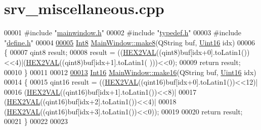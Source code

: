\hypertarget{a00048_source}{\section{srv\+\_\+miscellaneous.\+cpp}
\label{a00048_source}
}

\begin{DoxyCode}
00001 \textcolor{preprocessor}{#include "\hyperlink{a00039}{mainwindow.h}"}
00002 \textcolor{preprocessor}{#include "\hyperlink{a00001}{typedef.h}"}
00003 \textcolor{preprocessor}{#include "\hyperlink{a00034}{define.h}"}
00004 
\hypertarget{a00048_source_l00005}{}\hyperlink{a00006_aebce94d5e6af7afff661daf74b208de1}{00005} \hyperlink{a00001_aafb609548b1aa0152c46f9205b79d0f0}{Int8} \hyperlink{a00006_aebce94d5e6af7afff661daf74b208de1}{MainWindow::make8}(QString buf, \hyperlink{a00001_aae7407b021d43f7193a81a58cfb3e297}{Uint16} idx)
00006 \{
00007     qint8 result;
00008     result = ((\hyperlink{a00034_a428b04d2e2f2da2ea031a6c731660a71}{HEX2VAL}((qint8)buf[idx+0].toLatin1())<<4)|(\hyperlink{a00034_a428b04d2e2f2da2ea031a6c731660a71}{HEX2VAL}((qint8)buf[idx+1].toLatin1(
      )))<<0);
00009     \textcolor{keywordflow}{return} result;
00010 \}
00011 
00012 
\hypertarget{a00048_source_l00013}{}\hyperlink{a00006_afcb06d9f3a6a555df9355af1dfbb4e21}{00013} \hyperlink{a00001_a3985266aecb120f269789241c170850c}{Int16}  \hyperlink{a00006_afcb06d9f3a6a555df9355af1dfbb4e21}{MainWindow::make16}(QString buf, \hyperlink{a00001_aae7407b021d43f7193a81a58cfb3e297}{Uint16} idx)
00014 \{
00015     qint16 result = ((\hyperlink{a00034_a428b04d2e2f2da2ea031a6c731660a71}{HEX2VAL}((qint16)buf[idx+0].toLatin1())<<12)|
00016             (\hyperlink{a00034_a428b04d2e2f2da2ea031a6c731660a71}{HEX2VAL}((qint16)buf[idx+1].toLatin1())<<8)|
00017             (\hyperlink{a00034_a428b04d2e2f2da2ea031a6c731660a71}{HEX2VAL}((qint16)buf[idx+2].toLatin1())<<4)|
00018             (\hyperlink{a00034_a428b04d2e2f2da2ea031a6c731660a71}{HEX2VAL}((qint16)buf[idx+3].toLatin1())<<0));
00019 
00020     \textcolor{keywordflow}{return} result;
00021 \}
00022 
00023 
\end{DoxyCode}
